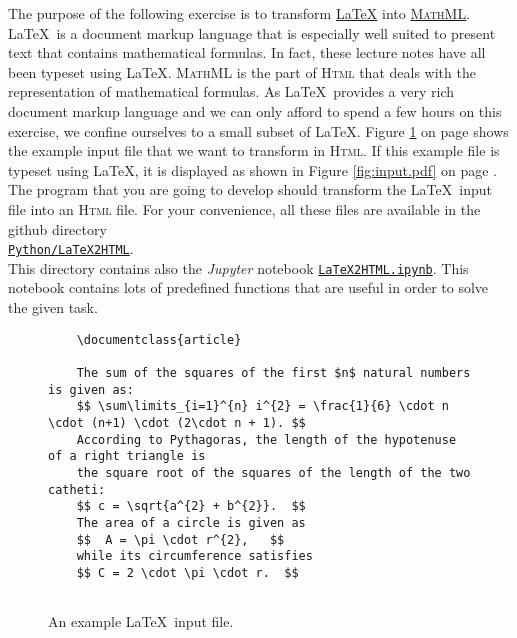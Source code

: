 \exerciseEng
The purpose of the following exercise is to transform \href{http://www.latex-project.org}{\LaTeX} into 
\href{https://www.tutorialspoint.com/mathml/index.htm}{\textsc{MathML}}.  \LaTeX\ is a document markup language
that is especially well suited to present text that contains mathematical formulas.  In fact, these
lecture notes have all been typeset using \LaTeX.  \textsc{MathML} is the part of \textsc{Html} that
deals with the representation of mathematical formulas.  As \LaTeX\ provides a very rich
document markup language and we can only afford to spend a few hours on this exercise, we confine
ourselves to a small subset of \LaTeX.  Figure \ref{fig:input.tex} on page \pageref{fig:input.tex}
shows the example input file that we want to transform in \textsc{Html}.  If this example file is
typeset using \LaTeX, it is displayed as shown in Figure \ref{fig:input.pdf} on page
\pageref{fig:input.pdf}.  The program that you are
going to develop should transform the \LaTeX\ input file into an \textsc{Html} file.  For your
convenience, all these files are available in the github directory 
\\[0.2cm]
\hspace*{1.3cm}
\href{https://github.com/karlstroetmann/Formal-Languages/tree/master/Python/Chapter-03/05-LaTeX2HTML}{\texttt{Python/LaTeX2HTML}}.
\\[0.2cm]
This directory contains also the \textsl{Jupyter} notebook 
\href{https://github.com/karlstroetmann/Formal-Languages/blob/master/Python/Chapter-03/05-LaTeX2HTML/LaTeX2HTML.ipynb}{\texttt{LaTeX2HTML.ipynb}}.
This notebook contains lots of predefined functions that are useful in order to solve the given task.

\begin{figure}[!ht]
  \centering
\begin{verbatim}
    \documentclass{article}
    
    The sum of the squares of the first $n$ natural numbers is given as:
    $$ \sum\limits_{i=1}^{n} i^{2} = \frac{1}{6} \cdot n \cdot (n+1) \cdot (2\cdot n + 1). $$
    According to Pythagoras, the length of the hypotenuse of a right triangle is
    the square root of the squares of the length of the two catheti:
    $$ c = \sqrt{a^{2} + b^{2}}.  $$
    The area of a circle is given as 
    $$  A = \pi \cdot r^{2},   $$ 
    while its circumference satisfies
    $$ C = 2 \cdot \pi \cdot r.  $$
    
    \end{verbatim}
  \caption{An example \LaTeX\ input file.}
  \label{fig:input.tex}
\end{figure}

